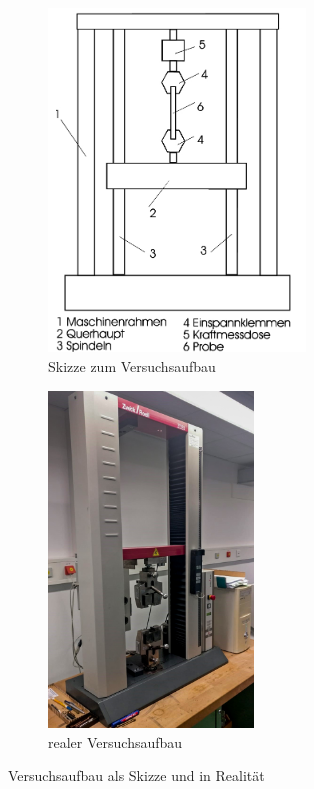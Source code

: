 \begin{figure}[h!]
	\centering
	\begin{subfigure}{.5\textwidth}
		\centering
		\includegraphics[width=0.75\textwidth]{img/Aufbau2}
		\caption{Skizze zum Versuchsaufbau}
		\label{fig:sub1}
	\end{subfigure}%
	\begin{subfigure}{.5\textwidth}
		\centering
		\includegraphics[width=0.6\textwidth]{img/Aufbau1}
		\caption{realer Versuchsaufbau}
		\label{fig:sub2}
	\end{subfigure}
	\caption{Versuchsaufbau als Skizze und in Realität}
	\label{fig:aufbau} 
\end{figure}
\FloatBarrier

